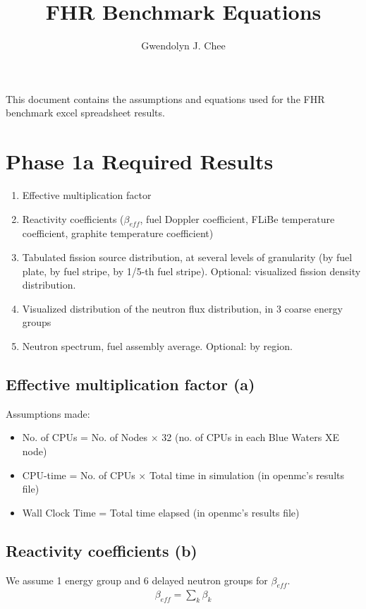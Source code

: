 \documentclass[letterpaper,11pt]{article}
\author{Gwendolyn J. Chee}
\title{FHR Benchmark Equations }
\begin{document}
\maketitle
\hrulefill
\onehalfspacing

This document contains the assumptions and equations used for the FHR 
benchmark excel spreadsheet results. 

\section{Phase 1a Required Results}
\begin{enumerate}[label=(\alph*)]
    \item Effective multiplication factor 
    \item Reactivity coefficients ($\beta_{eff}$, fuel Doppler coefficient, FLiBe 
    temperature coefficient, graphite temperature coefficient)
    \item Tabulated fission source distribution, at several levels of granularity 
    (by fuel plate, by fuel stripe, by 1/5-th fuel stripe). Optional: visualized fission 
    density distribution.
    \item Visualized distribution of the neutron flux distribution, in 3 coarse energy groups
    \item Neutron spectrum, fuel assembly average. Optional: by region.
\end{enumerate}

\subsection{Effective multiplication factor (a)}
Assumptions made: 
\begin{itemize}
    \item No. of CPUs = No. of Nodes $\times$ 32 (no. of CPUs in each Blue Waters XE node)
    \item CPU-time = No. of CPUs $\times$ Total time in simulation (in openmc's results file)
    \item Wall Clock Time = Total time elapsed (in openmc's results file)
\end{itemize}

\subsection{Reactivity coefficients (b)}
We assume 1 energy group and 6 delayed neutron groups for $\beta_{eff}$. 
\begin{align*}
    \beta_{eff} = \sum_k \beta_k
\end{align*}
\end{document}
